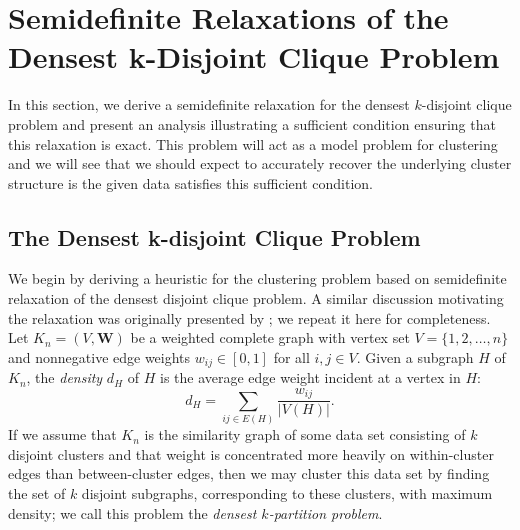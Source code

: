 \documentclass[twoside,11pt]{article}
\newcommand{\bs}{\boldsymbol}
\newcommand{\W}{\bs {W}}
\newcommand{\0}{\bs{0}}
\begin{document}
\section{Semidefinite Relaxations of the Densest k-Disjoint Clique Problem}

In this section, we derive a semidefinite relaxation for the densest \(k\)-disjoint clique problem
and present an analysis illustrating a sufficient condition ensuring that this relaxation
is exact. This problem will act as a model problem for clustering and we will see that
we should expect
to accurately recover the underlying cluster structure is the given data
satisfies this sufficient condition.

\subsection{The Densest k-disjoint Clique Problem}
\label{sec: kdc}
We begin by deriving a heuristic for the clustering problem based on semidefinite relaxation
of the densest disjoint clique problem.
A similar discussion motivating the relaxation was originally presented by \cite{ames2014guaranteed}; we repeat it here for completeness.
Let $K_n=(V, \W)$ be a weighted complete graph with vertex set
$V=\{1,2,\dots,n\}$ and nonnegative edge weights $w_{ij} \in [0,1]$ for all $i,j \in V$.
Given a subgraph \(H\) of \(K_n\), the \emph{density} \(d_H\) of \(H\)
is the average edge weight incident at a vertex in \(H\):
\[
d_H = \sum_{ij \in E(H)} \frac{w_{ij}}{|V(H)|}.
\]
If we assume that \(K_n\) is the similarity graph of some data set consisting
of \(k\) disjoint clusters and that weight
is concentrated more heavily on within-cluster edges than between-cluster
edges, then we may cluster this data set by finding the set of \(k\) disjoint
subgraphs, corresponding to these clusters, with maximum density;
we call this problem the \emph{densest \(k\)-partition problem}.
\end{document}
